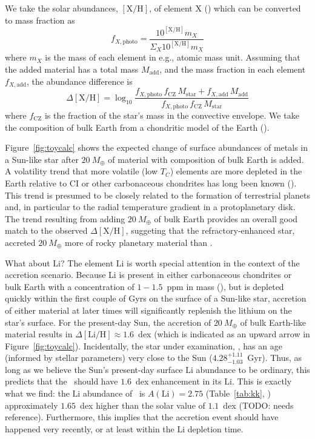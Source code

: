 \documentclass[modern, letterpaper]{aastex61}
\newcommand{\figname}{Figure}
\newcommand*\elem[1]{\ensuremath{\mathrm{#1}}}
\newcommand*\elemH[1]{\ensuremath{[\mathrm{#1}/\elem{H}]}}
\newcommand{\sunanalog}{\text{Krios}}
\newcommand{\bizarreone}{\text{Kronos}}
\newcommand{\Tcondens}{\ensuremath{T_C}}
\newcommand{\mearth}{\ensuremath{M_\oplus}}
\newcommand{\todo}[1]{{\color{blue}TODO: #1}}
\begin{document}
We take the solar abundances, $\elemH{X}$, of element \elem{X}
(\citealt{Asplund:2009aa}) which can be converted to mass fraction as
\begin{equation}
  f_{X,\mathrm{photo}} = \frac{10^{\elemH{X}} m_X}{\Sigma_X 10^{\elemH{X}} m_X}
\end{equation}
where $m_X$ is the mass of each element in e.g., atomic mass unit.
Assuming that the added material has a total mass $M_\mathrm{add}$, and the
mass fraction in each element $f_{X,\mathrm{add}}$,
the abundance difference is
\begin{equation}
  \Delta\elemH{X} = \log_{10} \frac{f_{X,\mathrm{photo}}\,f_\mathrm{CZ}\,M_\mathrm{star}
    + f_{X,\mathrm{add}}\,M_\mathrm{add}}
    {f_{X,\mathrm{photo}}\,f_\mathrm{CZ}\,M_\mathrm{star}}
\end{equation}
where $f_\mathrm{CZ}$ is the fraction of the star's mass in the convective envelope.
We take the composition of bulk Earth from a chondritic model of the Earth
(\citealt{mcdonough2001composition}).

Figure~\ref{fig:toycalc} shows the expected change of surface abundances of
metals in a Sun-like star after $20~\mearth$ of material with composition of
bulk Earth is added.
A volatility trend that more volatile (low \Tcondens) elements are more
depleted in the Earth relative to CI or other carbonaceous chondrites
has long been known (\citealt{mcdonough2001composition}).
This trend is presumed to be closely related to the formation of terrestrial
planets and, in particular to the radial temperature gradient in a
protoplanetary disk.
The trend resulting from adding $20~\mearth$ of bulk Earth
provides an overall good match to the observed $\Delta\elemH{X}$,
suggeting that the refractory-enhanced star, \bizarreone\,
accreted $20~\mearth$ more of rocky planetary material than \sunanalog.

What about \elem{Li}?
The element \elem{Li} is worth special attention in the context of the
accretion scenario.
Because Li is present in either carbonaceous chondrites or bulk Earth with
a concentration of $1-1.5$~ppm in mass (\citealt{mcdonough2001composition}),
but is depleted quickly within the first couple of Gyrs on the surface of a
Sun-like star, accretion of either material at later times will significantly
replenish the lithium on the star's surface.
For the present-day Sun, the accretion of $20~\mearth$ of bulk Earth-like
material results in $\Delta\elemH{Li} \approx 1.6$~dex (which
is indicated as an upward arrow in \figname~\ref{fig:toycalc}).
Incidentally, the star under examination, \bizarreone, has an age (informed by
stellar parameters) very close to the Sun ($4.28_{-1.03}^{+1.11}$~Gyr).
Thus, as long as we believe the Sun's present-day surface \elem{Li} abundance
to be ordinary, this predicts that the \bizarreone\ should have $1.6$~dex
enhancement in its \elem{Li}.
This is exactly what we find: the \elem{Li} abundance of \bizarreone\ is
$A(\elem{Li}) = 2.75$ (Table~\ref{tab:kk}, \citealt{jmlithium})
approximately $1.65$~dex higher than the solar value of $1.1$~dex
(\todo{needs reference}).
Furthermore, this implies that the accretion event should have happened very
recently, or at least within the \elem{Li} depletion time.
\end{document}
